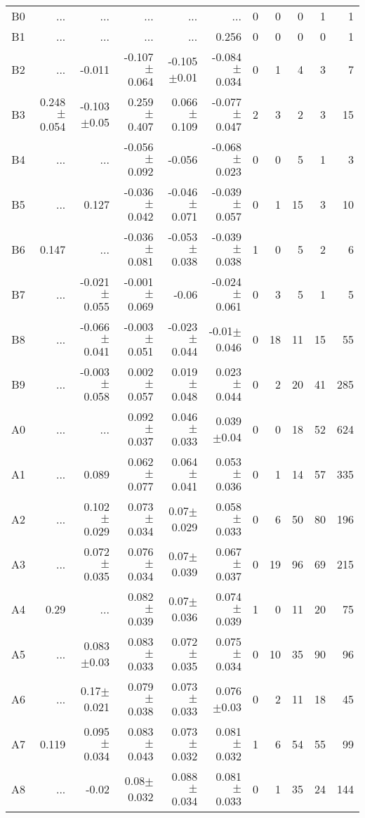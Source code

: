 \begin{table}[t]
\begin{table}[t]
\begin{center}
\begin{tabular}{c|rrrrr|rrrrr}
    B0	&	 ...	&	 ...	&	 ...	&	 ...	&	 ...	&	0	&	0	&	0	&	1	&	1	\\
    B1	&	 ...	&	 ...	&	 ...	&	 ...	&	0.256	&	0	&	0	&	0	&	0	&	1	\\
    B2	&	 ...	&	-0.011	&	-0.107$\pm$0.064	&	-0.105$\pm$0.01	&	-0.084$\pm$0.034	&	0	&	1	&	4	&	3	&	7	\\
    B3	&	0.248$\pm$0.054	&	-0.103$\pm$0.05	&	0.259$\pm$0.407	&	0.066$\pm$0.109	&	-0.077$\pm$0.047	&	2	&	3	&	2	&	3	&	15	\\
    B4	&	 ...	&	 ...	&	-0.056$\pm$0.092	&	-0.056	&	-0.068$\pm$0.023	&	0	&	0	&	5	&	1	&	3	\\
    B5	&	 ...	&	0.127	&	-0.036$\pm$0.042	&	-0.046$\pm$0.071	&	-0.039$\pm$0.057	&	0	&	1	&	15	&	3	&	10	\\
    B6	&	0.147	&	 ...	&	-0.036$\pm$0.081	&	-0.053$\pm$0.038	&	-0.039$\pm$0.038	&	1	&	0	&	5	&	2	&	6	\\
    B7	&	 ...	&	-0.021$\pm$0.055	&	-0.001$\pm$0.069	&	-0.06	&	-0.024$\pm$0.061	&	0	&	3	&	5	&	1	&	5	\\
    B8	&	 ...	&	-0.066$\pm$0.041	&	-0.003$\pm$0.051	&	-0.023$\pm$0.044	&	-0.01$\pm$0.046	&	0	&	18	&	11	&	15	&	55	\\
    B9	&	 ...	&	-0.003$\pm$0.058	&	0.002$\pm$0.057	&	0.019$\pm$0.048	&	0.023$\pm$0.044	&	0	&	2	&	20	&	41	&	285	\\
    A0	&	 ...	&	 ...	&	0.092$\pm$0.037	&	0.046$\pm$0.033	&	0.039$\pm$0.04	&	0	&	0	&	18	&	52	&	624	\\
    A1	&	 ...	&	0.089	&	0.062$\pm$0.077	&	0.064$\pm$0.041	&	0.053$\pm$0.036	&	0	&	1	&	14	&	57	&	335	\\
    A2	&	 ...	&	0.102$\pm$0.029	&	0.073$\pm$0.034	&	0.07$\pm$0.029	&	0.058$\pm$0.033	&	0	&	6	&	50	&	80	&	196	\\
    A3	&	 ...	&	0.072$\pm$0.035	&	0.076$\pm$0.034	&	0.07$\pm$0.039	&	0.067$\pm$0.037	&	0	&	19	&	96	&	69	&	215	\\
    A4	&	0.29	&	 ...	&	0.082$\pm$0.039	&	0.07$\pm$0.036	&	0.074$\pm$0.039	&	1	&	0	&	11	&	20	&	75	\\
    A5	&	 ...	&	0.083$\pm$0.03	&	0.083$\pm$0.033	&	0.072$\pm$0.035	&	0.075$\pm$0.034	&	0	&	10	&	35	&	90	&	96	\\
    A6	&	 ...	&	0.17$\pm$0.021	&	0.079$\pm$0.038	&	0.073$\pm$0.033	&	0.076$\pm$0.03	&	0	&	2	&	11	&	18	&	45	\\
    A7	&	0.119	&	0.095$\pm$0.034	&	0.083$\pm$0.043	&	0.073$\pm$0.032	&	0.081$\pm$0.032	&	1	&	6	&	54	&	55	&	99	\\
    A8	&	 ...	&	-0.02	&	0.08$\pm$0.032	&	0.088$\pm$0.034	&	0.081$\pm$0.033	&	0	&	1	&	35	&	24	&	144	\\

\end{tabular}
\end{center}
\end{table}
\end{table}

